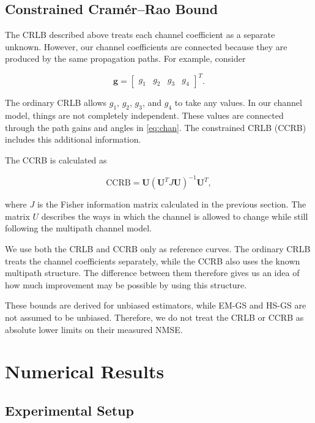 \documentclass[journal]{IEEEtran}
\newcommand{\bU}{\mathbf{U}}
\newcommand{\bg}{\mathbf{g}}
\begin{document}
\subsection{Constrained Cramér--Rao Bound}

The CRLB described above treats each channel coefficient as a separate
unknown. However, our channel coefficients are connected because they are
produced by the same propagation paths. For example, consider

\begin{equation}
\bg=
\begin{bmatrix}
g_1 & g_2 & g_3 & g_4
\end{bmatrix}^{T}.
\end{equation}

The ordinary CRLB allows $g_1$, $g_2$, $g_3$, and $g_4$ to take any
values. In our channel model, things are not completely independent. These
values are connected through the path gains and angles in
\eqref{eq:chan}. The constrained CRLB (CCRB) includes this additional
information.

The CCRB is calculated as~\cite{gorman1990,stoica1998}

\begin{equation}
\mathrm{CCRB}
=
\bU(\bU^T J\bU)^{-1}\bU^T,
\end{equation}

where $J$ is the Fisher information matrix calculated in the previous
section. The matrix $U$ describes the ways in which the channel is allowed
to change while still following the multipath channel model.

We use both the CRLB and CCRB only as reference curves. The ordinary CRLB
treats the channel coefficients separately, while the CCRB also uses the
known multipath structure. The difference between them therefore gives us
an idea of how much improvement may be possible by using this structure.

These bounds are derived for unbiased estimators, while EM-GS and HS-GS
are not assumed to be unbiased. Therefore, we do not treat the CRLB or
CCRB as absolute lower limits on their measured NMSE.


\section{Numerical Results}
\label{sec:results}

\subsection{Experimental Setup}
\end{document}
